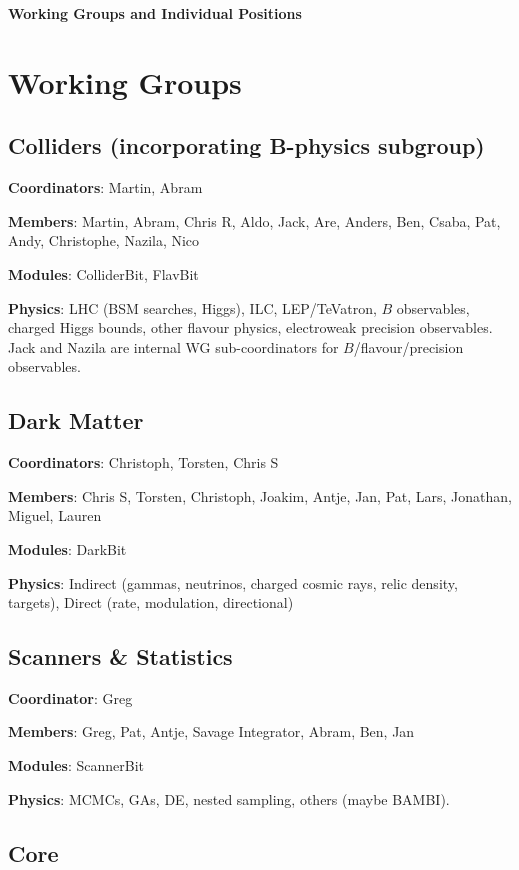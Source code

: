 

\centerline{\textbf{Working Groups and Individual Positions}}\bigskip 


\section{Working Groups}

\subsection{Colliders (incorporating B-physics subgroup)}

\textbf{Coordinators}: Martin, Abram

\textbf{Members}: Martin, Abram, Chris R, Aldo, Jack, Are, Anders, Ben, Csaba, Pat, Andy, Christophe, Nazila, Nico 

\textbf{Modules}: ColliderBit, FlavBit

\textbf{Physics}: LHC (BSM searches, Higgs), ILC, LEP/TeVatron, $B$ observables, charged Higgs bounds, other flavour physics, electroweak precision observables.  Jack and Nazila are internal WG sub-coordinators for $B$/flavour/precision observables.


\subsection{Dark Matter}

\textbf{Coordinators}: Christoph, Torsten, Chris S

\textbf{Members}: Chris S, Torsten, Christoph, Joakim, Antje, Jan, Pat, Lars, Jonathan, Miguel, Lauren

\textbf{Modules}: DarkBit

\textbf{Physics}: Indirect (gammas, neutrinos, charged cosmic rays, relic density, targets), Direct (rate, modulation, directional)


\subsection{Scanners \& Statistics}

\textbf{Coordinator}: Greg

\textbf{Members}: Greg, Pat, Antje, Savage Integrator, Abram, Ben, Jan

\textbf{Modules}: ScannerBit

\textbf{Physics}: MCMCs, GAs, DE, nested sampling, others (maybe BAMBI).


\subsection{Core}

